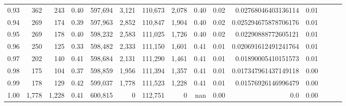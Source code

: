 \begin{tabular}{rrrrrrrrrrrrrrr}
0.93 &     362 &    243 &  0.40 &  597,694 &    3,121 &  110,673 &    2,078 &  0.40 &  0.02 &   0.02768046403136114 &      0.01 \\
0.94 &     269 &    174 &  0.39 &  597,963 &    2,852 &  110,847 &    1,904 &  0.40 &  0.02 &  0.025294675878706176 &      0.01 \\
0.95 &     269 &    178 &  0.40 &  598,232 &    2,583 &  111,025 &    1,726 &  0.40 &  0.02 &   0.02290888772605121 &      0.01 \\
0.96 &     250 &    125 &  0.33 &  598,482 &    2,333 &  111,150 &    1,601 &  0.41 &  0.01 &  0.020691612491241764 &      0.01 \\
0.97 &     202 &    140 &  0.41 &  598,684 &    2,131 &  111,290 &    1,461 &  0.41 &  0.01 &   0.01890005410151573 &      0.01 \\
0.98 &     175 &    104 &  0.37 &  598,859 &    1,956 &  111,394 &    1,357 &  0.41 &  0.01 &  0.017347961437149118 &      0.00 \\
0.99 &     178 &    129 &  0.42 &  599,037 &    1,778 &  111,523 &    1,228 &  0.41 &  0.01 &   0.01576926146996479 &      0.00 \\
1.00 &   1,778 &  1,228 &  0.41 &  600,815 &        0 &  112,751 &        0 &   nan &  0.00 &                   0.0 &      0.00 \\
\bottomrule
\end{tabular}
